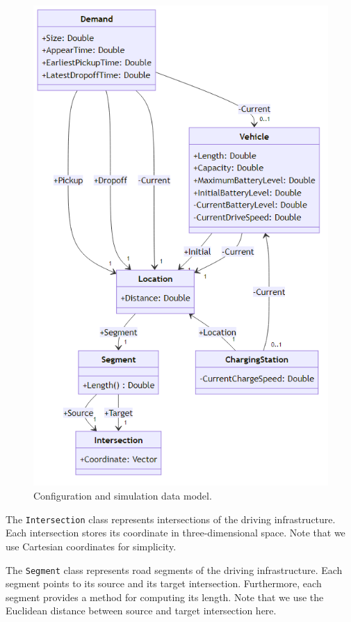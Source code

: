 \documentclass[a4paper,twoside]{article}
\begin{document}
	\begin{figure}[!ht]
		\centering
		\includegraphics[scale=0.4]{../../diagrams/model/classes-v0.2.png}
		\caption{Configuration and simulation data model.}
		\label{fig:data-model}
	\end{figure}
	
	The \texttt{Intersection} class represents intersections of the driving infrastructure.
	Each intersection stores its coordinate in three-dimensional space.
	Note that we use Cartesian coordinates for simplicity.
	
	The \texttt{Segment} class represents road segments of the driving infrastructure.
	Each segment points to its source and its target intersection.
	Furthermore, each segment provides a method for computing its length.
	Note that we use the Euclidean distance between source and target intersection here.
	
\end{document}
